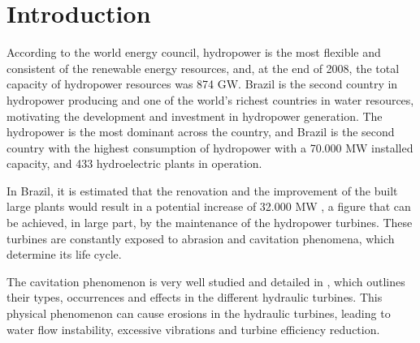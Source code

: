 \section{Introduction}
According to the world energy council, hydropower is the most flexible and
consistent of the renewable energy resources, and, at the end of 2008, the total
capacity of hydropower resources was 874 GW. Brazil is the second
country in hydropower producing and one of the world's richest countries in
water resources, motivating the development and investment in hydropower
generation. The hydropower is the most dominant across the country, and Brazil
is the second country with the highest consumption of hydropower with a 70.000
MW installed capacity, and 433 hydroelectric plants in operation.


In Brazil, it is estimated that the renovation and the improvement of the built
large plants would result in a potential increase of 32.000 MW
\citep{goldemberg2007energia}, a figure that can be achieved, in large part, by
the maintenance of the hydropower turbines. These turbines are constantly
exposed to abrasion and cavitation phenomena, which determine its life cycle.

The cavitation phenomenon is very well studied and detailed in
\cite{escaler2006detection}, which outlines their types, occurrences and
effects in the different hydraulic turbines. This physical phenomenon can cause
erosions in the hydraulic turbines, leading to water flow instability,
excessive vibrations and turbine efficiency reduction.

